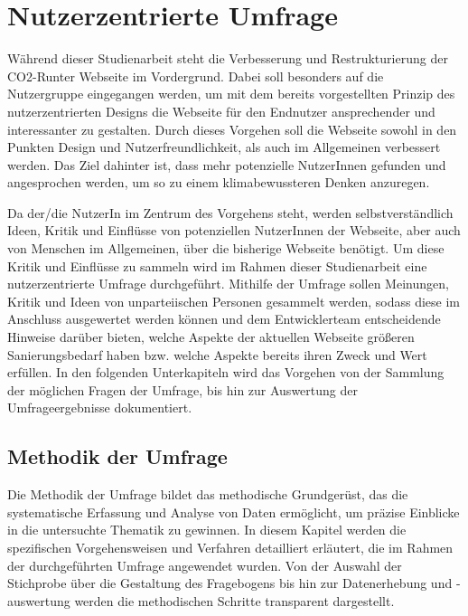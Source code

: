 \chapter{Nutzerzentrierte Umfrage}
\label{chapter:4}

Während dieser Studienarbeit steht die Verbesserung und Restrukturierung der CO2-Runter Webseite im Vordergrund.
Dabei soll besonders auf die Nutzergruppe eingegangen werden, um mit dem bereits vorgestellten Prinzip des nutzerzentrierten Designs die Webseite für den Endnutzer ansprechender und interessanter zu gestalten.
Durch dieses Vorgehen soll die Webseite sowohl in den Punkten Design und Nutzerfreundlichkeit, als auch im Allgemeinen verbessert werden.
Das Ziel dahinter ist, dass mehr potenzielle NutzerInnen gefunden und angesprochen werden, um so zu einem klimabewussteren Denken anzuregen.

Da der/die NutzerIn im Zentrum des Vorgehens steht, werden selbstverständlich Ideen, Kritik und Einflüsse von potenziellen NutzerInnen der Webseite, aber auch von Menschen im Allgemeinen, über die bisherige Webseite benötigt.
Um diese Kritik und Einflüsse zu sammeln wird im Rahmen dieser Studienarbeit eine nutzerzentrierte Umfrage durchgeführt.
Mithilfe der Umfrage sollen Meinungen, Kritik und Ideen von unparteiischen Personen gesammelt werden, sodass diese im Anschluss ausgewertet werden können und dem Entwicklerteam entscheidende Hinweise darüber bieten, welche Aspekte der aktuellen Webseite größeren Sanierungsbedarf haben bzw.
welche Aspekte bereits ihren Zweck und Wert erfüllen.
In den folgenden Unterkapiteln wird das Vorgehen von der Sammlung der möglichen Fragen der Umfrage, bis hin zur Auswertung der Umfrageergebnisse dokumentiert.

\section{Methodik der Umfrage}

Die Methodik der Umfrage bildet das methodische Grundgerüst, das die systematische Erfassung und Analyse von Daten ermöglicht, um präzise Einblicke in die untersuchte Thematik zu gewinnen. In diesem Kapitel werden die spezifischen Vorgehensweisen und Verfahren detailliert erläutert, die im Rahmen der durchgeführten Umfrage angewendet wurden.
Von der Auswahl der Stichprobe über die Gestaltung des Fragebogens bis hin zur Datenerhebung und -auswertung werden die methodischen Schritte transparent dargestellt.

